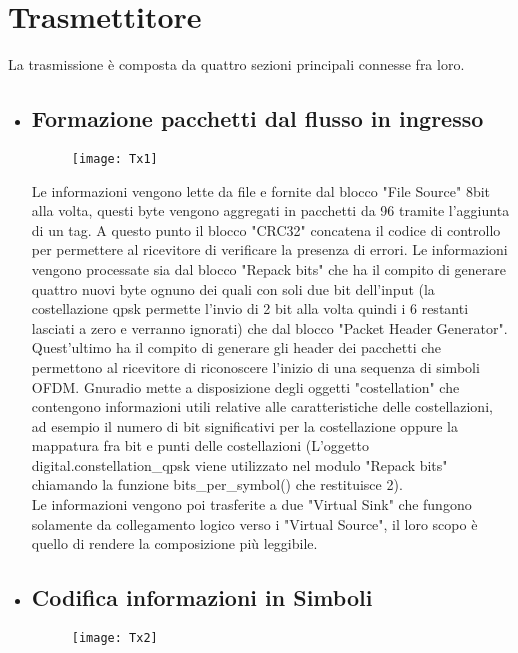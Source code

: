  \section{Trasmettitore}
 La trasmissione è composta da quattro sezioni principali connesse fra loro.
 \begin{itemize}
 	\item \subsection{Formazione pacchetti dal flusso in ingresso}
 	\begin{figure}[h]
 		\raggedleft
 		\texttt{[image: Tx1]}
 		\caption{}
 	\end{figure}
 Le informazioni vengono lette da file e fornite dal blocco "File Source" 8bit alla volta, questi byte vengono aggregati in pacchetti da 96 tramite l'aggiunta di un tag. A questo punto il blocco "CRC32" concatena il codice di controllo per permettere al ricevitore di verificare la presenza di errori. Le informazioni vengono processate sia dal blocco "Repack bits" che ha il compito di generare quattro nuovi byte ognuno dei quali con soli due bit dell'input (la costellazione qpsk permette l'invio di 2 bit alla volta quindi i 6 restanti lasciati a zero e verranno ignorati) che dal blocco "Packet Header Generator". Quest'ultimo ha il compito di generare gli header dei pacchetti che permettono al ricevitore di riconoscere l'inizio di una sequenza di simboli OFDM. Gnuradio mette a disposizione degli oggetti "costellation" che contengono informazioni utili relative alle caratteristiche delle costellazioni, ad esempio il numero di bit significativi per la costellazione oppure la mappatura fra bit e punti delle costellazioni (L'oggetto digital.constellation\_qpsk viene utilizzato nel modulo "Repack bits" chiamando la funzione bits\_per\_symbol() che restituisce 2).\\ Le informazioni vengono poi trasferite a due "Virtual Sink" che fungono solamente da collegamento logico verso i "Virtual Source", il loro scopo è quello di rendere la composizione più leggibile.
 	\item \subsection{Codifica informazioni in Simboli}
 	\begin{figure}[h]
 		\raggedleft
 		\texttt{[image: Tx2]}
 		\caption{}
 	\end{figure}

\end{itemize}
